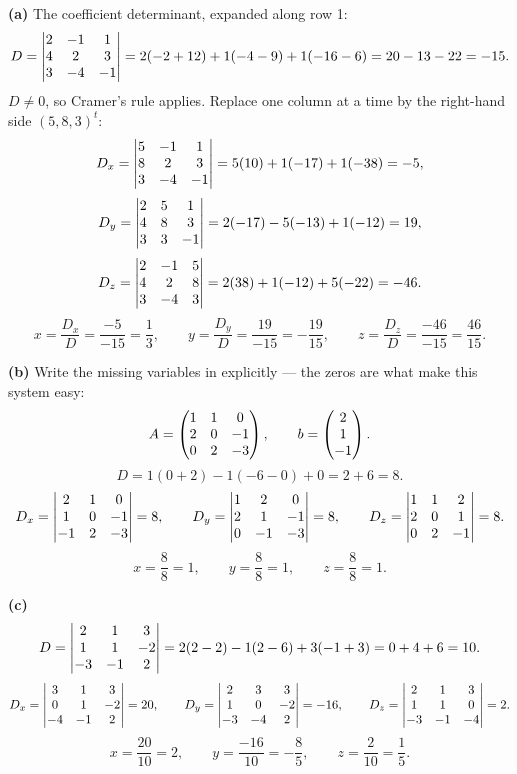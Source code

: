 \begin{solution}
\textbf{(a)} The coefficient determinant, expanded along row 1:
\[
D=\begin{vmatrix}2&-1&1\\4&2&3\\3&-4&-1\end{vmatrix}
=2(-2+12)+1(-4-9)+1(-16-6)=20-13-22=-15 .
\]
$D\neq 0$, so Cramer's rule applies. Replace one column at a time by the
right-hand side $(5,8,3)^{t}$:
\[
D_x=\begin{vmatrix}5&-1&1\\8&2&3\\3&-4&-1\end{vmatrix}=5(10)+1(-17)+1(-38)=-5,
\]
\[
D_y=\begin{vmatrix}2&5&1\\4&8&3\\3&3&-1\end{vmatrix}=2(-17)-5(-13)+1(-12)=19,
\]
\[
D_z=\begin{vmatrix}2&-1&5\\4&2&8\\3&-4&3\end{vmatrix}=2(38)+1(-12)+5(-22)=-46 .
\]
\[
x=\frac{D_x}{D}=\frac{-5}{-15}=\frac13,\qquad
y=\frac{D_y}{D}=\frac{19}{-15}=-\frac{19}{15},\qquad
z=\frac{D_z}{D}=\frac{-46}{-15}=\frac{46}{15}.
\]

\medskip
\textbf{(b)} Write the missing variables in explicitly --- the zeros are what
make this system easy:
\[
A=\begin{pmatrix}1&1&0\\2&0&-1\\0&2&-3\end{pmatrix},\qquad b=\begin{pmatrix}2\\1\\-1\end{pmatrix}.
\]
\[
D=1(0+2)-1(-6-0)+0=2+6=8 .
\]
\[
D_x=\begin{vmatrix}2&1&0\\1&0&-1\\-1&2&-3\end{vmatrix}=8,\qquad
D_y=\begin{vmatrix}1&2&0\\2&1&-1\\0&-1&-3\end{vmatrix}=8,\qquad
D_z=\begin{vmatrix}1&1&2\\2&0&1\\0&2&-1\end{vmatrix}=8 .
\]
\[
x=\frac88=1,\qquad y=\frac88=1,\qquad z=\frac88=1 .
\]

\medskip
\textbf{(c)}
\[
D=\begin{vmatrix}2&1&3\\1&1&-2\\-3&-1&2\end{vmatrix}=2(2-2)-1(2-6)+3(-1+3)=0+4+6=10 .
\]
\[
D_x=\begin{vmatrix}3&1&3\\0&1&-2\\-4&-1&2\end{vmatrix}=20,\qquad
D_y=\begin{vmatrix}2&3&3\\1&0&-2\\-3&-4&2\end{vmatrix}=-16,\qquad
D_z=\begin{vmatrix}2&1&3\\1&1&0\\-3&-1&-4\end{vmatrix}=2 .
\]
\[
x=\frac{20}{10}=2,\qquad y=\frac{-16}{10}=-\frac85,\qquad
z=\frac{2}{10}=\frac15 .
\]


\end{solution}
